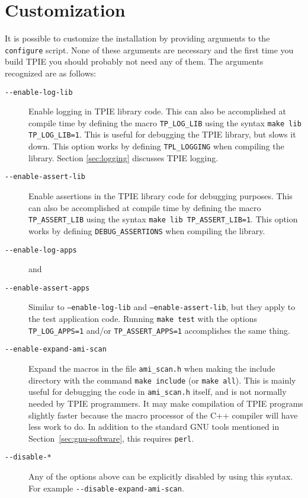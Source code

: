 \section{Customization}

It is possible to customize the installation by providing arguments to
the {\tt configure} script. None of these
arguments are necessary and the first time you build TPIE you should
probably not need any of them. The arguments recognized are as
follows:
\begin{description}
\item[\verb|--enable-log-lib|] 
  Enable logging in TPIE library code.
  This can also be accomplished at compile time by defining the macro
  \verb|TP_LOG_LIB| using the syntax \verb|make lib TP_LOG_LIB=1|.
  This is useful for debugging the TPIE library, but slows it down.
  This option works by defining \verb|TPL_LOGGING|
  when compiling the library. 
  Section \ref{sec:logging} discusses TPIE logging.
\item[\verb|--enable-assert-lib|]  
  Enable assertions in the TPIE library code for debugging purposes.
  This can also be accomplished at compile time by defining the macro
  \verb|TP_ASSERT_LIB| using the syntax \verb|make lib TP_ASSERT_LIB=1|.
  This option works by defining \verb|DEBUG_ASSERTIONS|
  when compiling the library.
\item[\verb|--enable-log-apps|]  and
\item[\verb|--enable-assert-apps|]  
  Similar to {\tt --enable-log-lib} and {\tt --enable-assert-lib}, but
  they apply to the test application code.  Running \verb|make test|
  with the options \verb|TP_LOG_APPS=1| and/or \verb|TP_ASSERT_APPS=1|
  accomplishes the same thing.
\item[\verb|--enable-expand-ami-scan|]  Expand the macros in the file
  \verb|ami_scan.h| when making the include directory with the
command {\tt make include} (or {\tt make all}).  This is mainly useful for
debugging the code in \verb|ami_scan.h| itself, and is not normally
needed by TPIE programmers.  It may make compilation of TPIE programs
slightly faster because the macro processor of the C++ compiler will
have less work to do.  In addition to the standard GNU tools mentioned
in Section~\ref{sec:gnu-software}, this requires \verb|perl|.
\item[\verb|--disable-*|]  Any of the options above can be explicitly
  disabled  by using this syntax.  For example
  \verb|--disable-expand-ami-scan|. 
\end{description}


